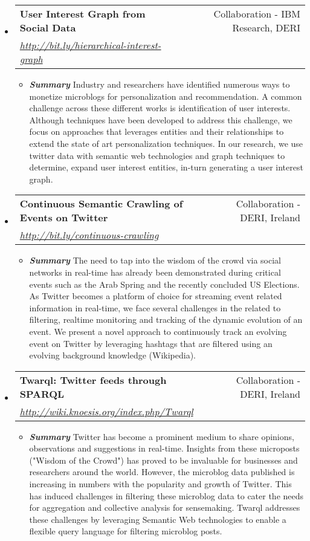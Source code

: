 \documentclass[letterpaper,11pt]{article}
\makeatletter
\newcommand{\ressubheading}[4]{
\begin{tabular*}{7.0in}{l@{\extracolsep{\fill}}r}
		\textbf{#1} & #2 \\
		\textit{#3} & \textit{#4} \\
\end{tabular*}\vspace{-6pt}}
\makeatother
\begin{document}
\begin{itemize}
\item 
\ressubheading{User Interest Graph from Social Data}{Collaboration - IBM Research, DERI}{\url{http://bit.ly/hierarchical-interest-graph}}{}
	\linebreak
	\begin{itemize}
\item \textit{\textbf{Summary}} Industry and researchers have identified numerous ways to monetize microblogs for personalization and recommendation. A common challenge across these different works is identification of user interests. Although techniques have been developed to address this challenge, we focus on approaches that leverages entities and their relationships to extend the state of art personalization techniques. In our research, we use twitter data with semantic web technologies and graph techniques to determine, expand user interest entities, in-turn generating a user interest graph. 
\end{itemize}

\item
	\ressubheading{Continuous Semantic Crawling of Events on Twitter}{Collaboration - DERI, Ireland}{\url{http://bit.ly/continuous-crawling}}{}
	\linebreak
	\begin{itemize}
\item \textit{\textbf{Summary}} The need to tap into the wisdom of the crowd via social networks in real-time has already been demonstrated during critical events such as the Arab Spring and the recently concluded US Elections. As Twitter becomes a platform of choice for streaming event related information in real-time, we face several challenges in the related to filtering, realtime monitoring and tracking of the dynamic evolution of an event. We present a novel approach to continuously track an evolving event on Twitter by leveraging hashtags that are filtered using an evolving background knowledge (Wikipedia).
\end{itemize}

\item
\ressubheading{Twarql: Twitter feeds through SPARQL}{Collaboration - DERI, Ireland}{\url{http://wiki.knoesis.org/index.php/Twarql}}{}
\linebreak
\begin{itemize}
    \item \textit{\textbf{Summary}} Twitter has become a prominent medium to share opinions, observations and suggestions in real-time. Insights from these microposts ("Wisdom of the Crowd") has proved to be invaluable for businesses and researchers around the world. However, the microblog data published is increasing in numbers with the popularity and growth of Twitter. This has induced challenges in filtering these microblog data to cater the needs for aggregation and collective analysis for sensemaking. Twarql addresses these challenges by leveraging Semantic Web technologies to enable a flexible query language for filtering microblog posts.
\end{itemize}


\end{itemize}
\end{document}
